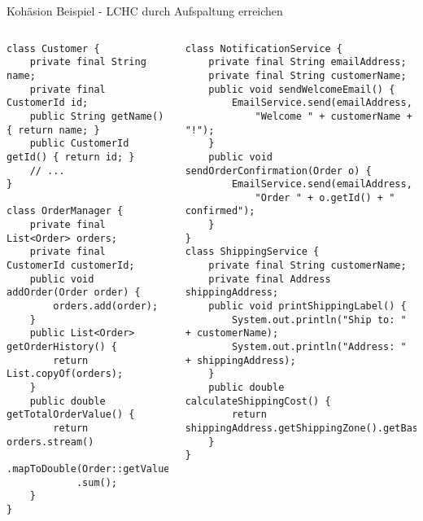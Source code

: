 \begin{frame}[fragile]{Kohäsion Beispiel - LCHC durch Aufspaltung erreichen}
  \begin{columns}[T]
    \begin{lstlisting}[style=java, basicstyle=\tiny\ttfamily]
class Customer {
    private final String name;
    private final CustomerId id;
    public String getName() { return name; }
    public CustomerId getId() { return id; }
    // ...
}

class OrderManager {
    private final List<Order> orders;
    private final CustomerId customerId;
    public void addOrder(Order order) {
        orders.add(order);
    }
    public List<Order> getOrderHistory() {
        return List.copyOf(orders);
    }
    public double getTotalOrderValue() {
        return orders.stream()
            .mapToDouble(Order::getValue)
            .sum();
    }
}
    \end{lstlisting}
    \begin{lstlisting}[style=java, basicstyle=\tiny\ttfamily]
class NotificationService {
    private final String emailAddress;
    private final String customerName;
    public void sendWelcomeEmail() {
        EmailService.send(emailAddress,
            "Welcome " + customerName + "!");
    }
    public void sendOrderConfirmation(Order o) {
        EmailService.send(emailAddress,
            "Order " + o.getId() + " confirmed");
    }
}
class ShippingService {
    private final String customerName;
    private final Address shippingAddress;
    public void printShippingLabel() {
        System.out.println("Ship to: " + customerName);
        System.out.println("Address: " + shippingAddress);
    }
    public double calculateShippingCost() {
        return shippingAddress.getShippingZone().getBaseCost();
    }
}
    \end{lstlisting}
  \end{columns}
\end{frame}


